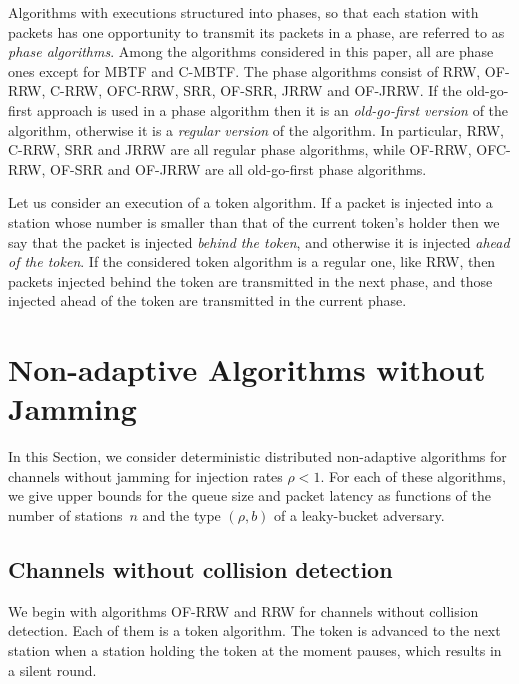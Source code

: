\documentclass[11pt]{article}
\begin{document}
Algorithms with executions structured into phases, so that each station with packets has one opportunity to transmit its packets in a phase, are referred to as \emph{phase algorithms}. 
Among the algorithms considered in this paper, all are phase ones except for \textsc{MBTF} and \textsc{C-MBTF}.
The phase algorithms consist of \textsc{RRW}, \textsc{OF-RRW}, \textsc{C-RRW}, \textsc{OFC-RRW}, \textsc{SRR}, \textsc{OF-SRR}, \textsc{JRRW} and \textsc{OF-JRRW}.
If the old-go-first approach is used in a phase algorithm then it is  an  \emph{old-go-first version} of the algorithm, otherwise it is a \emph{regular version} of the algorithm.
In particular, \textsc{RRW},  \textsc{C-RRW}, \textsc{SRR} and \textsc{JRRW} are all regular phase algorithms, while \textsc{OF-RRW}, \textsc{OFC-RRW}, \textsc{OF-SRR} and \textsc{OF-JRRW} are all old-go-first phase algorithms.


Let us consider an execution of a  token algorithm.
If a packet is injected into a station whose number is smaller than that of the current token's holder then we say that the packet is injected \emph{behind the token}, and otherwise it is injected \emph{ahead of the token}.
If the considered token algorithm is a regular one, like \textsc{RRW}, then packets injected behind the token are transmitted in the next phase, and those injected ahead of the token are  transmitted in the current phase.


\section{Non-adaptive Algorithms without Jamming}

\label{sec:non-adaptive-algorithms-without-jamming}




In this Section, we consider deterministic distributed non-adaptive algorithms for channels without jamming for injection rates $\rho < 1$. 
For each of these algorithms, we give upper bounds for the queue size and packet latency as functions of the number of stations~$n$ and the type $(\rho,b)$ of a leaky-bucket adversary. 



\subsection{Channels without collision detection}




We begin with algorithms \textsc{OF-RRW} and \textsc{RRW} for channels without collision detection. 
Each of them is a token algorithm.
The token is advanced to the next station when a station holding the token at the moment pauses, which results in a silent round.
\end{document}
